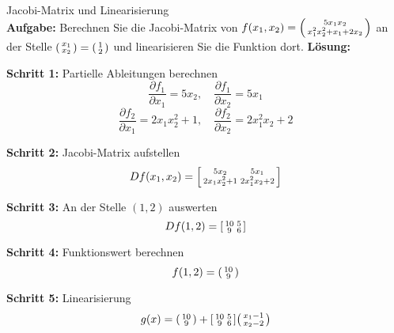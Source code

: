 \begin{example2}{Jacobi-Matrix und Linearisierung}\\
\textbf{Aufgabe:} Berechnen Sie die Jacobi-Matrix von $f(x_1, x_2) = \begin{psmallmatrix} 5x_1 x_2 \\ x_1^2 x_2^2 + x_1 + 2x_2 \end{psmallmatrix}$ an der Stelle $\begin{psmallmatrix} x_1 \\ x_2 \end{psmallmatrix} = \begin{psmallmatrix} 1 \\ 2 \end{psmallmatrix}$ und linearisieren Sie die Funktion dort.
\tcblower
\textbf{Lösung:}

\textbf{Schritt 1:} Partielle Ableitungen berechnen
$$\frac{\partial f_1}{\partial x_1} = 5x_2, \quad \frac{\partial f_1}{\partial x_2} = 5x_1$$
$$\frac{\partial f_2}{\partial x_1} = 2x_1 x_2^2 + 1, \quad \frac{\partial f_2}{\partial x_2} = 2x_1^2 x_2 + 2$$

\textbf{Schritt 2:} Jacobi-Matrix aufstellen
$$Df(x_1, x_2) = \begin{bsmallmatrix} 5x_2 & 5x_1 \\ 2x_1 x_2^2 + 1 & 2x_1^2 x_2 + 2 \end{bsmallmatrix}$$

\textbf{Schritt 3:} An der Stelle $(1, 2)$ auswerten
$$Df(1, 2) = \begin{bsmallmatrix} 10 & 5 \\ 9 & 6 \end{bsmallmatrix}$$

\textbf{Schritt 4:} Funktionswert berechnen
$$f(1, 2) = \begin{psmallmatrix} 10 \\ 9 \end{psmallmatrix}$$

\textbf{Schritt 5:} Linearisierung
$$g(x) = \begin{psmallmatrix} 10 \\ 9 \end{psmallmatrix} + \begin{bsmallmatrix} 10 & 5 \\ 9 & 6 \end{bsmallmatrix} \begin{psmallmatrix} x_1 - 1 \\ x_2 - 2 \end{psmallmatrix}$$
\end{example2}

